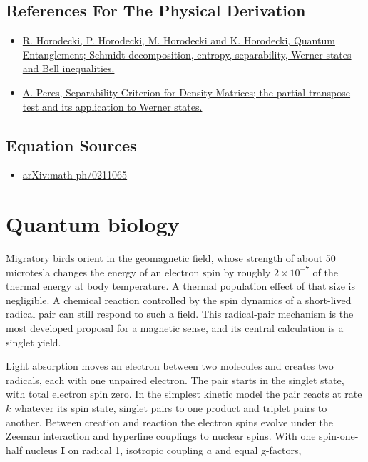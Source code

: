 \documentclass[11pt,oneside]{book}
\begin{document}
\subsection*{References For The Physical Derivation}
\begin{itemize}
\item \href{https://arxiv.org/abs/quant-ph/0702225}{R. Horodecki, P. Horodecki, M. Horodecki and K. Horodecki, Quantum Entanglement; Schmidt decomposition, entropy, separability, Werner states and Bell inequalities.}
\item \href{https://arxiv.org/abs/quant-ph/9604005}{A. Peres, Separability Criterion for Density Matrices; the partial-transpose test and its application to Werner states.}
\end{itemize}



\subsection*{Equation Sources}
\begin{itemize}
\item \href{https://arxiv.org/abs/math-ph/0211065}{arXiv:math-ph/0211065}
\end{itemize}

\clearpage

\section{Quantum biology}

\label{topic:quantum-biology}

Migratory birds orient in the geomagnetic field, whose strength of about 50 microtesla changes the energy of an electron spin by roughly \(2\times10^{-7}\) of the thermal energy at body temperature. A thermal population effect of that size is negligible. A chemical reaction controlled by the spin dynamics of a short-lived radical pair can still respond to such a field. This radical-pair mechanism is the most developed proposal for a magnetic sense, and its central calculation is a singlet yield.

Light absorption moves an electron between two molecules and creates two radicals, each with one unpaired electron. The pair starts in the singlet state, with total electron spin zero. In the simplest kinetic model the pair reacts at rate \(k\) whatever its spin state, singlet pairs to one product and triplet pairs to another. Between creation and reaction the electron spins evolve under the Zeeman interaction and hyperfine couplings to nuclear spins. With one spin-one-half nucleus \(\mathbf I\) on radical 1, isotropic coupling \(a\) and equal g-factors,
\end{document}

